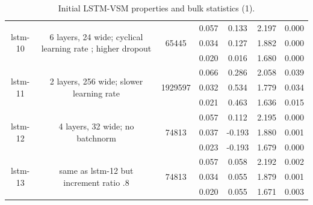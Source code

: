 \begin{table}[h!p]
\begin{sideways}
\begin{tabular}{c|c|c|c|c|c|c }
\hline
\multirow{3}{6em}{lstm-10} & \multirow{3}{16em}{6 layers, 24 wide; cyclical learning rate ; higher dropout} & \multirow{3}{4em}{65445} & 0.057 & 0.133 & 2.197 & 0.000 \\ & & & 0.034 & 0.127 & 1.882 & 0.000 \\ & & & 0.020 & 0.016 & 1.680 & 0.000 \\
\hline
\multirow{3}{6em}{lstm-11} & \multirow{3}{16em}{2 layers, 256 wide; slower learning rate} & \multirow{3}{4em}{1929597} & 0.066 & 0.286 & 2.058 & 0.039 \\ & & & 0.032 & 0.534 & 1.779 & 0.034 \\ & & & 0.021 & 0.463 & 1.636 & 0.015 \\
\hline
\multirow{3}{6em}{lstm-12} & \multirow{3}{16em}{4 layers, 32 wide; no batchnorm} & \multirow{3}{4em}{74813} & 0.057 & 0.112 & 2.195 & 0.000 \\ & & & 0.037 & -0.193 & 1.880 & 0.001 \\ & & & 0.023 & -0.193 & 1.679 & 0.000 \\
\hline
\multirow{3}{6em}{lstm-13} & \multirow{3}{16em}{same as lstm-12 but increment ratio .8} & \multirow{3}{4em}{74813} & 0.057 & 0.058 & 2.192 & 0.002 \\ & & & 0.034 & 0.055 & 1.879 & 0.001 \\ & & & 0.020 & 0.055 & 1.671 & 0.003 \\
    \end{tabular}
\end{sideways}
    \caption{Initial LSTM-VSM properties and bulk statistics (1).}
    \label{model-init-lstm-table-1}
\end{table}

